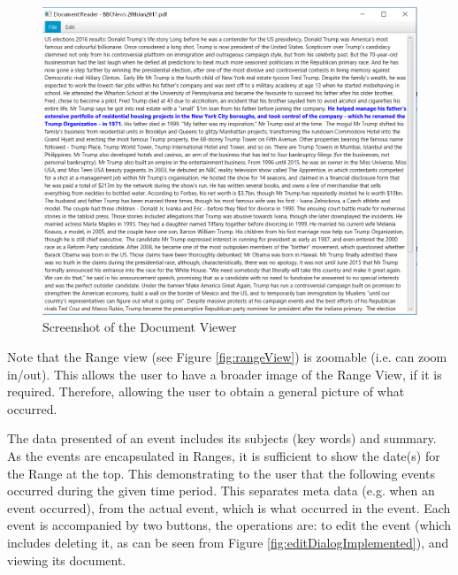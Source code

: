 \begin{figure}[h]
\caption{Screenshot of the Document Viewer}
\label{fig:viewDocImplemented}
\includegraphics[width=\linewidth]{viewDocImplemented.png}
\centering
\end{figure}

\par Note that the Range view (see Figure \ref{fig:rangeView}) is zoomable (i.e. can zoom in/out). This allows the user to have a broader image of the Range View, if it is required. Therefore, allowing the user to obtain a general picture of what occurred.

\par The data presented of an event includes its subjects (key words) and summary. As the events are encapsulated in Ranges, it is sufficient to show the date(s) for the Range at the top. This demonstrating to the user that the following events occurred during the given time period.  This separates meta data (e.g. when an event occurred), from the actual event, which is what occurred in the event. Each event is accompanied by two buttons, the operations are: to edit the event (which includes deleting it, as can be seen from Figure \ref{fig:editDialogImplemented}), and viewing its document.

